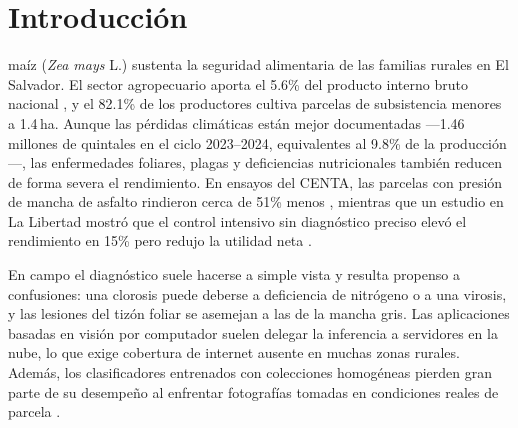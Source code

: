 \documentclass[conference,letterpaper]{IEEEtran}
\begin{document}
\section{Introducción}

 maíz (\textit{Zea mays} L.) sustenta la seguridad alimentaria de las familias rurales en El Salvador. El sector agropecuario aporta el 5.6\% del producto interno bruto nacional \cite{bcr2023}, y el 82.1\% de los productores cultiva parcelas de subsistencia menores a 1.4\,ha. Aunque las pérdidas climáticas están mejor documentadas —1.46 millones de quintales en el ciclo 2023--2024, equivalentes al 9.8\% de la producción \cite{edh2024}—, las enfermedades foliares, plagas y deficiencias nutricionales también reducen de forma severa el rendimiento. En ensayos del CENTA, las parcelas con presión de mancha de asfalto rindieron cerca de 51\% menos \cite{deras2015}, mientras que un estudio en La Libertad mostró que el control intensivo sin diagnóstico preciso elevó el rendimiento en 15\% pero redujo la utilidad neta \cite{eash2019}.

En campo el diagnóstico suele hacerse a simple vista y resulta propenso a confusiones: una clorosis puede deberse a deficiencia de nitrógeno o a una virosis, y las lesiones del tizón foliar se asemejan a las de la mancha gris. Las aplicaciones basadas en visión por computador suelen delegar la inferencia a servidores en la nube, lo que exige cobertura de internet ausente en muchas zonas rurales. Además, los clasificadores entrenados con colecciones homogéneas pierden gran parte de su desempeño al enfrentar fotografías tomadas en condiciones reales de parcela \cite{mohanty2016,ferentinos2018,ahmad2023}.
\end{document}
